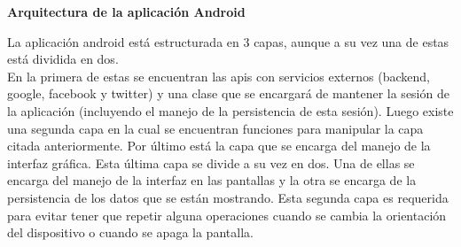 \documentclass[12pt]{article}%
\begin{document}

\textbf{Arquitectura de la aplicaci\'on Android}

La aplicaci\'on android est\'a estructurada en 3 capas, aunque a su vez una de estas est\'a dividida en dos.\\
En la primera de estas se encuentran las apis con servicios externos (backend, google, facebook y twitter) y una clase que se encargar\'a de mantener la sesi\'on de la aplicaci\'on (incluyendo el manejo de la persistencia de esta sesi\'on). Luego existe una segunda capa en la cual se encuentran funciones para manipular la capa citada anteriormente. Por \'ultimo est\'a la capa que se encarga del manejo de la interfaz gr\'afica. Esta \'ultima capa se divide a su vez en dos. Una de ellas se encarga del manejo de la interfaz en las pantallas y la otra se encarga de la persistencia de los datos que se est\'an mostrando. Esta segunda capa es requerida para evitar tener que repetir alguna operaciones cuando se cambia la orientaci\'on del dispositivo o cuando se apaga la pantalla.
\end{document}
